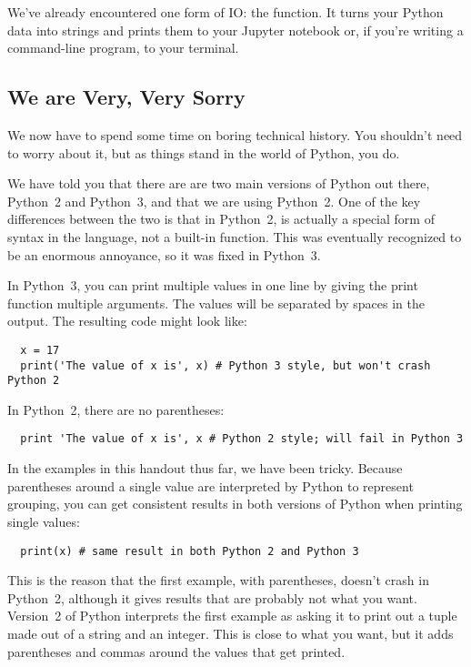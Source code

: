 \documentclass[letterpaper, 12pt, titlepage, twoside]{article}
\begin{document}
We've already encountered one form of IO: the  function. It turns
your Python data into strings and prints them to your Jupyter notebook or, if
you're writing a command-line program, to your terminal.

\subsection*{We are Very, Very Sorry}

We now have to spend some time on boring technical history. You shouldn't need
to worry about it, but as things stand in the world of Python, you do.

We have told you that there are are two main versions of Python out there,
Python~2 and Python~3, and that we are using Python~2. One of the key
differences between the two is that in Python~2,  is actually a
special form of syntax in the language, not a built-in function. This was
eventually recognized to be an enormous annoyance, so it was fixed in
Python~3.

In Python~3, you can print multiple values in one line by giving the print
function multiple arguments. The values will be separated by spaces in the
output. The resulting code might look like:

\begin{lstlisting}
  x = 17
  print('The value of x is', x) # Python 3 style, but won't crash Python 2
\end{lstlisting}

In Python~2, there are no parentheses:

\begin{lstlisting}
  print 'The value of x is', x # Python 2 style; will fail in Python 3
\end{lstlisting}

In the examples in this handout thus far, we have been tricky. Because
parentheses around a single value are interpreted by Python to represent
grouping, you can get consistent results in both versions of Python when
printing single values:

\begin{lstlisting}
  print(x) # same result in both Python 2 and Python 3
\end{lstlisting}

This is the reason that the first example, with parentheses, doesn't crash in
Python~2, although it gives results that are probably not what you want.
Version~2 of Python interprets the first example as asking it to print out a
tuple made out of a string and an integer. This is close to what you want, but
it adds parentheses and commas around the values that get printed.
\end{document}
